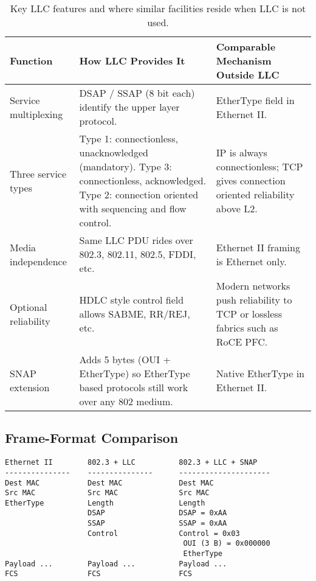 \documentclass[../../../OAE-SPEC-MAIN.tex]{subfiles}
\begin{document}
\begin{table}[h]
\centering
\footnotesize
\begin{tabular}{@{}p{3cm}p{6cm}p{5cm}@{}}
\toprule
\textbf{Function} & \textbf{How LLC Provides It} & \textbf{Comparable Mechanism Outside LLC} \\
\midrule
Service multiplexing & DSAP / SSAP (8 bit each) identify the upper layer protocol. & EtherType field in Ethernet II. \\
Three service types & Type 1: connectionless, unacknowledged (mandatory).  Type 3: connectionless, acknowledged.  Type 2: connection oriented with sequencing and flow control. & IP is always connectionless; TCP gives connection oriented reliability above L2. \\
Media independence & Same LLC PDU rides over 802.3, 802.11, 802.5, FDDI, etc. & Ethernet II framing is Ethernet only. \\
Optional reliability & HDLC style control field allows SABME, RR/REJ, etc. & Modern networks push reliability to TCP or lossless fabrics such as RoCE PFC. \\
SNAP extension & Adds 5 bytes (OUI + EtherType) so EtherType based protocols still work over any 802 medium. & Native EtherType in Ethernet II. \\
\bottomrule
\end{tabular}
\caption{Key LLC features and where similar facilities reside when LLC is not used.}
\end{table}

\subsection{Frame-Format Comparison}

\begin{verbatim}
Ethernet II        802.3 + LLC          802.3 + LLC + SNAP
---------------    ---------------      ---------------------
Dest MAC           Dest MAC             Dest MAC
Src MAC            Src MAC              Src MAC
EtherType          Length               Length
                   DSAP                 DSAP = 0xAA
                   SSAP                 SSAP = 0xAA
                   Control              Control = 0x03
                                         OUI (3 B) = 0x000000
                                         EtherType
Payload ...        Payload ...          Payload ...
FCS                FCS                  FCS
\end{verbatim}
\end{document}
